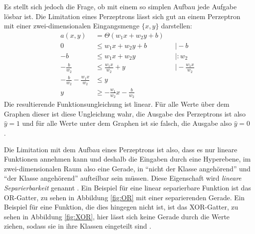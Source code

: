 \documentclass[12pt,titlepage]{article}
\begin{document}
Es stellt sich jedoch die Frage, ob mit einem so simplen Aufbau jede Aufgabe lösbar ist. Die Limitation eines Perzeptrons lässt sich gut an einem Perzeptron mit einer zwei-dimensionalen Eingangsmenge \(\{x, y\}\) darstellen:
\begin{align*}
  a(x, y)                            & = \Theta ( w_1 x + w_2 y + b )                                         \\
  0                                  & \leq w_1 x + w_2 y + b                  &  & \vert -b                  \\
  -b                                 & \leq w_1 x + w_2 y                      &  & \vert : w_2               \\
  -\frac{b}{w_2}                     & \leq \frac{w_1 x}{w_2} + y              &  & \vert - \frac{w_1 x}{w_2} \\
  -\frac{b}{w_2} - \frac{w_1 x}{w_2} & \leq  y                                                                \\
  y                                  & \geq -\frac{w_1}{w_2} x - \frac{b}{w_2}
\end{align*}
Die resultierende Funktionsungleichung ist linear. Für alle Werte über dem Graphen dieser ist diese Ungleichung wahr, die Ausgabe des Perzeptrons ist also \(\hat{y}=1\) und für alle Werte unter dem Graphen ist sie falsch, die Ausgabe also \(\hat{y}=0\).

Die Limitation mit dem Aufbau eines Perzeptrons ist also, dass es nur lineare Funktionen annehmen kann und deshalb die Eingaben durch eine Hyperebene, im zwei-dimensionalen Raum also eine Gerade, in \enquote{nicht der Klasse angehörend} und \enquote{der Klasse angehörend} aufteilbar sein müssen. Diese Eigenschaft wird \textit{lineare Separierbarkeit} genannt \autocite[7]{suzukiArtificialNeuralNetworks2011}. Ein Beispiel für eine linear separierbare Funktion ist das OR-Gatter, zu sehen in Abbildung \ref{fig:OR} mit einer separierenden Gerade. Ein Beispiel für eine Funktion, die dies hingegen nicht ist, ist das XOR-Gatter, zu sehen in Abbildung \ref{fig:XOR}, hier lässt sich keine Gerade durch die Werte ziehen, sodass sie in ihre Klassen eingeteilt sind \autocite[9]{abdiNeuralNetworkPrimer1994}.
\end{document}
